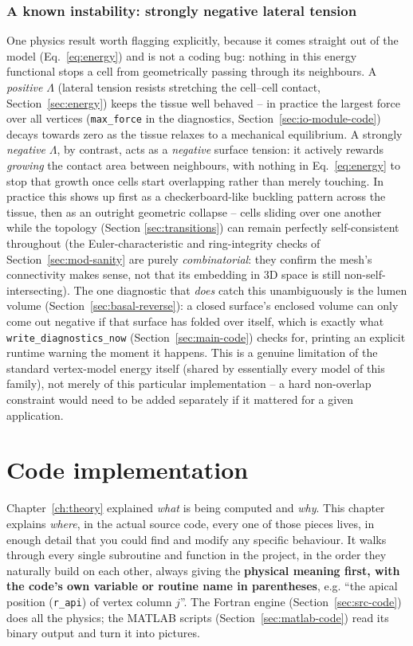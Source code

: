\documentclass[11pt,a4paper]{report}
\begin{document}
\subsection{A known instability: strongly negative lateral tension}
\label{sec:instability}
One physics result worth flagging explicitly, because it comes
straight out of the model (Eq.~\ref{eq:energy}) and is not a coding
bug: nothing in this energy functional stops a cell from
geometrically passing through its neighbours. A \emph{positive}
$\Lambda$ (lateral tension resists stretching the cell--cell contact,
Section~\ref{sec:energy}) keeps the tissue well behaved -- in practice
the largest force over all vertices (\texttt{max\_force} in the
diagnostics, Section~\ref{sec:io-module-code}) decays towards zero as
the tissue relaxes to a mechanical equilibrium. A strongly
\emph{negative} $\Lambda$, by contrast, acts as a \emph{negative}
surface tension: it actively rewards \emph{growing} the contact area
between neighbours, with nothing in Eq.~\ref{eq:energy} to stop that
growth once cells start overlapping rather than merely touching. In
practice this shows up first as a checkerboard-like buckling pattern
across the tissue, then as an outright geometric collapse -- cells
sliding over one another while the topology (Section
\ref{sec:transitions}) can remain perfectly self-consistent throughout
(the Euler-characteristic and ring-integrity checks of
Section~\ref{sec:mod-sanity} are purely \emph{combinatorial}: they
confirm the mesh's connectivity makes sense, not that its embedding in
3D space is still non-self-intersecting). The one diagnostic that
\emph{does} catch this unambiguously is the lumen volume
(Section~\ref{sec:basal-reverse}): a closed surface's enclosed volume
can only come out negative if that surface has folded over itself,
which is exactly what \texttt{write\_diagnostics\_now}
(Section~\ref{sec:main-code}) checks for, printing an explicit runtime
warning the moment it happens. This is a genuine limitation of the
standard vertex-model energy itself (shared by essentially every
model of this family), not merely of this particular implementation --
a hard non-overlap constraint would need to be added separately if it
mattered for a given application.

\chapter{Code implementation}
\label{ch:code}

Chapter~\ref{ch:theory} explained \emph{what} is being computed and
\emph{why}. This chapter explains \emph{where}, in the actual source
code, every one of those pieces lives, in enough detail that you could
find and modify any specific behaviour. It walks through every single
subroutine and function in the project, in the order they naturally
build on each other, always giving the \textbf{physical meaning first,
with the code's own variable or routine name in parentheses}, e.g.
``the apical position (\texttt{r\_api}) of vertex column $j$''. The
Fortran engine (Section~\ref{sec:src-code}) does all the physics; the
MATLAB scripts (Section~\ref{sec:matlab-code}) read its binary output
and turn it into pictures.
\end{document}
